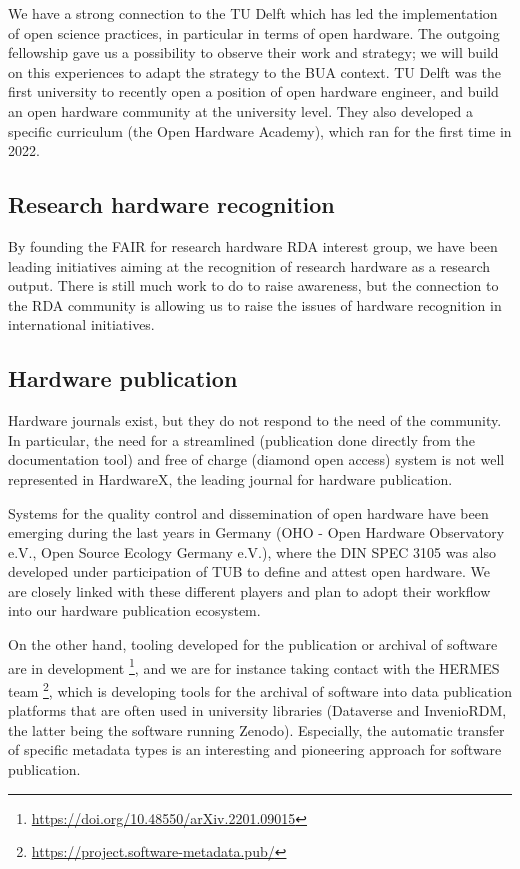 \documentclass[
  12pt,
  a4paper,
]{article}
\begin{document}
We have a strong connection to the TU Delft which has led the
implementation of open science practices, in particular in terms of open
hardware. The outgoing fellowship gave us a possibility to observe their
work and strategy; we will build on this experiences to adapt the
strategy to the BUA context. TU Delft was the first university to
recently open a position of open hardware engineer, and build an open
hardware community at the university level. They also developed a
specific curriculum (the Open Hardware Academy), which ran for the first
time in 2022.

\hypertarget{research-hardware-recognition}{%
\subsection{Research hardware
recognition}\label{research-hardware-recognition}}

By founding the FAIR for research hardware RDA interest group, we have
been leading initiatives aiming at the recognition of research hardware
as a research output. There is still much work to do to raise awareness,
but the connection to the RDA community is allowing us to raise the
issues of hardware recognition in international initiatives.

\hypertarget{hardware-publication}{%
\subsection{Hardware publication}\label{hardware-publication}}

Hardware journals exist, but they do not respond to the need of the
community. In particular, the need for a streamlined (publication done
directly from the documentation tool) and free of charge (diamond open
access) system is not well represented in HardwareX, the leading journal
for hardware publication.

Systems for the quality control and dissemination of open hardware have
been emerging during the last years in Germany (OHO - Open Hardware
Observatory e.V., Open Source Ecology Germany e.V.), where the DIN SPEC
3105 was also developed under participation of TUB to define and attest
open hardware. We are closely linked with these different players and
plan to adopt their workflow into our hardware publication ecosystem.

On the other hand, tooling developed for the publication or archival of
software are in development \footnote{\url{https://doi.org/10.48550/arXiv.2201.09015}},
and we are for instance taking contact with the HERMES team \footnote{\url{https://project.software-metadata.pub/}},
which is developing tools for the archival of software into data
publication platforms that are often used in university libraries
(Dataverse and InvenioRDM, the latter being the software running
Zenodo). Especially, the automatic transfer of specific metadata types
is an interesting and pioneering approach for software publication.
\end{document}
